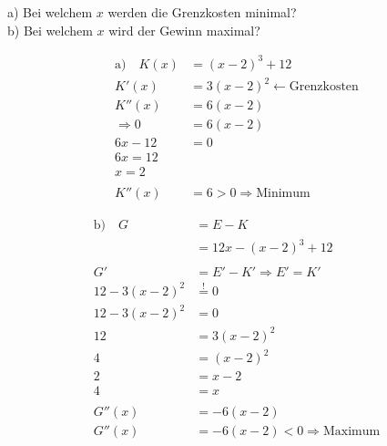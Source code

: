 a) Bei welchem \( x \) werden die Grenzkosten minimal? \\
b) Bei welchem \( x \) wird der Gewinn maximal?

\begin{align*}
    \text{a)}\quad K(x) &= {(x-2)}^3 + 12 \\
    K'(x) &= 3{(x-2)}^2 \leftarrow \text{Grenzkosten} \\
    K''(x) &= 6(x-2) \\
    \Rightarrow 0 &= 6(x-2) \\
    6x - 12 &= 0 \\
    6x = 12 \\
    x = 2 \\
    \\
    K''(x) &= 6 > 0 \Rightarrow \text{Minimum}
\end{align*}

\begin{align*}
    \text{b)}\quad G &= E - K \\
    &= 12x - {(x-2)}^3 + 12 \\
    \\
    G' &= E'-K' \Rightarrow E' = K' \\
    12 - 3{(x-2)}^2 &\overset{!}{=} 0 \\
    12 - 3{(x-2)}^2 &= 0 \\
    12 &= 3{(x-2)}^2 \\
    4 &= {(x-2)}^2 \\
    2 &= x-2 \\
    4 &= x \\
    \\
    G''(x) &= -6(x-2) \\
    G''(x) &= -6(x-2) < 0 \Rightarrow \text{Maximum}
\end{align*}

